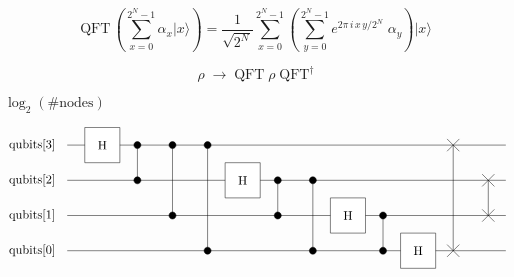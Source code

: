 \documentclass{article}
\begin{document}
\[
       \text{QFT} \, \left(  \sum\limits_{x=0}^{2^N-1} \alpha_x |x\rangle \right) 
       = 
       \frac{1}{\sqrt{2^N}}
        \sum\limits_{x=0}^{2^N-1} \left( 
            \sum\limits_{y=0}^{2^N-1} e^{2 \pi \, i \, x \, y / 2^N} \; \alpha_y
        \right) |x\rangle
    \]
\pagebreak

\[
       \rho \; \rightarrow \; \text{QFT} \; \rho \; \text{QFT}^{\dagger}
    \]
\pagebreak

$\log_2(\text{\#nodes})$
\pagebreak

\[
     \begin{tikzpicture}[scale=.5]
     \draw (-2, 5) -- (23, 5);    \node[draw=none] at (-4,5) {qubits[3]};
     \draw (-2, 3) -- (23, 3);    \node[draw=none] at (-4,3) {qubits[2]};
     \draw (-2, 1) -- (23, 1);     \node[draw=none] at (-4,1) {qubits[1]};
     \draw (-2, -1) -- (23, -1);  \node[draw=none] at (-4,-1) {qubits[0]};

     \draw[fill=white] (-1, 4) -- (-1, 6) -- (1, 6) -- (1,4) -- cycle;
     \node[draw=none] at (0, 5) {H};

     \draw(2, 5) -- (2, 3);
     \draw[fill=black] (2, 5) circle (.2);
     \draw[fill=black] (2, 3) circle (.2);
     \draw(4, 5) -- (4, 1);
     \draw[fill=black] (4, 5) circle (.2);
     \draw[fill=black] (4, 1) circle (.2);
     \draw(6, 5) -- (6, -1);
     \draw[fill=black] (6, 5) circle (.2);
     \draw[fill=black] (6, -1) circle (.2);

     \draw[fill=white] (-1+8, 4-2) -- (-1+8, 6-2) -- (1+8, 6-2) -- (1+8,4-2) -- cycle;
     \node[draw=none] at (8, 5-2) {H};

     \draw(10, 5-2) -- (10, 3-2);
     \draw[fill=black] (10, 5-2) circle (.2);
     \draw[fill=black] (10, 3-2) circle (.2);
     \draw(12, 5-2) -- (12, 3-4);
     \draw[fill=black] (12, 5-2) circle (.2);
     \draw[fill=black] (12, 3-4) circle (.2);

     \draw[fill=white] (-1+8+6, 4-4) -- (-1+8+6, 6-4) -- (1+8+6, 6-4) -- (1+8+6,4-4) -- cycle;
     \node[draw=none] at (8+6, 5-4) {H};

     \draw(16, 5-2-2) -- (16, 3-4);
     \draw[fill=black] (16, 5-2-2) circle (.2);
     \draw[fill=black] (16, 3-4) circle (.2);

     \draw[fill=white] (-1+8+6+4, 4-4-2) -- (-1+8+6+4, 6-4-2) -- (1+8+6+4, 6-4-2) -- (1+8+6+4,4-4-2) -- cycle;
     \node[draw=none] at (8+6+4, 5-4-2) {H};

     \draw (20, 5) -- (20, -1);
     \draw (20 - .35, 5 + .35) -- (20 + .35, 5 - .35);
     \draw (20 - .35, 5 - .35) -- (20 + .35, 5 + .35);
     \draw (20 - .35, -1 + .35) -- (20 + .35, -1 - .35);
     \draw (20 - .35, -1 - .35) -- (20 + .35, -1 + .35);
     \draw (22, 3) -- (22, 1);
     \draw (22 - .35, 3 + .35) -- (22 + .35, 3 - .35);
     \draw (22 - .35, 3 - .35) -- (22 + .35, 3 + .35);
     \draw (22 - .35, 1 + .35) -- (22 + .35, 1 - .35);
     \draw (22 - .35, 1 - .35) -- (22 + .35, 1 + .35);
     \end{tikzpicture}
\]
\pagebreak
\end{document}
